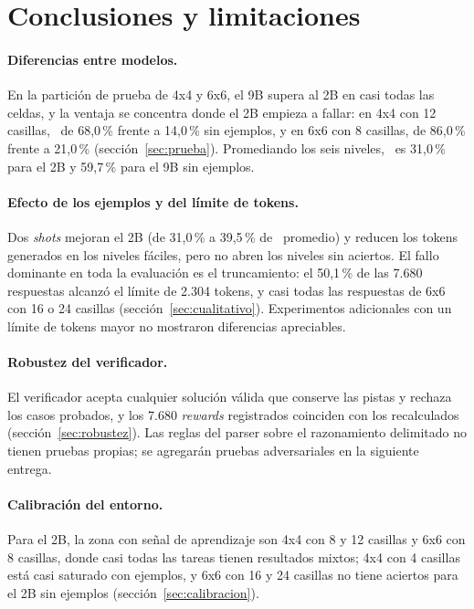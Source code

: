 \section{Conclusiones y limitaciones}
\label{sec:conclusiones}

\paragraph{Diferencias entre modelos.}
En la partición de prueba de 4x4 y 6x6, el 9B supera al 2B en casi todas las
celdas, y la ventaja se concentra donde el 2B empieza a fallar: en 4x4 con 12
casillas, \passuno\ de 68,0\,\% frente a 14,0\,\% sin ejemplos, y en 6x6 con 8
casillas, de 86,0\,\% frente a 21,0\,\% (sección~\ref{sec:prueba}). Promediando
los seis niveles, \passuno\ es 31,0\,\% para el 2B y 59,7\,\% para el 9B sin
ejemplos.

\paragraph{Efecto de los ejemplos y del límite de tokens.}
Dos \emph{shots} mejoran el 2B (de 31,0\,\% a 39,5\,\% de \passuno\ promedio) y
reducen los tokens generados en los niveles fáciles, pero no abren los niveles sin
aciertos. El fallo dominante en toda la evaluación es el truncamiento: el 50,1\,\%
de las 7.680 respuestas alcanzó el límite de 2.304 tokens, y casi todas las
respuestas de 6x6 con 16 o 24 casillas (sección~\ref{sec:cualitativo}). Experimentos
adicionales con un límite de tokens mayor no mostraron diferencias apreciables.

\paragraph{Robustez del verificador.}
El verificador acepta cualquier solución válida que conserve las pistas y
rechaza los casos probados, y los 7.680 \emph{rewards} registrados coinciden con
los recalculados (sección~\ref{sec:robustez}). Las reglas del parser sobre el
razonamiento delimitado no tienen pruebas propias; se agregarán pruebas
adversariales en la siguiente entrega.

\paragraph{Calibración del entorno.}
Para el 2B, la zona con señal de aprendizaje son 4x4 con 8 y 12 casillas y 6x6 con
8 casillas, donde casi todas las tareas tienen resultados mixtos; 4x4 con 4
casillas está casi saturado con ejemplos, y 6x6 con 16 y 24 casillas no tiene
aciertos para el 2B sin ejemplos (sección~\ref{sec:calibracion}).

